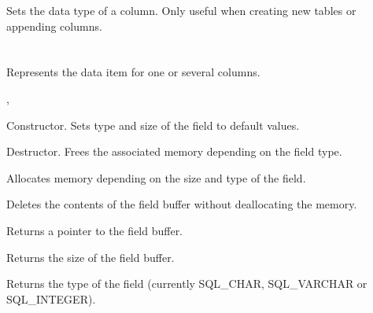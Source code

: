 Sets the data type of a column. Only useful when creating new tables or
appending columns.

\section{}\label{wxqueryfield}

Represents the data item for one or several columns.




, 




Constructor. Sets type and size of the field to default values.
  


Destructor. Frees the associated memory depending on the field type.



Allocates memory depending on the size and type of the field.



Deletes the contents of the field buffer without deallocating the memory.



Returns a pointer to the field buffer.



Returns the size of the field buffer.



Returns the type of the field (currently SQL\_CHAR, SQL\_VARCHAR or SQL\_INTEGER).
 
